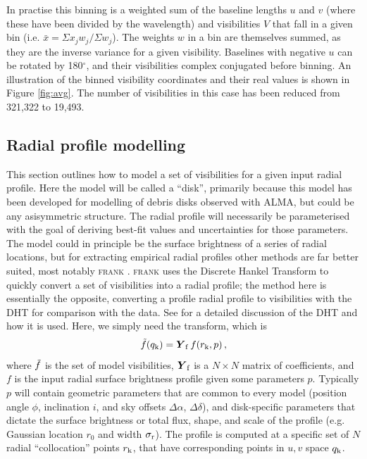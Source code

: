 \documentclass[fleqn,usenatbib]{mnras}
\begin{document}
In practise this binning is a weighted sum of the baseline lengths $u$ and $v$ (where these have been divided by the wavelength) and visibilities $V$ that fall in a given bin (i.e. $\bar{x} = \Sigma x_j w_j / \Sigma w_j$). The weights $w$ in a bin are themselves summed, as they are the inverse variance for a given visibility. Baselines with negative $u$ can be rotated by 180$^\circ$, and their visibilities complex conjugated before binning. An illustration of the binned visibility coordinates and their real values is shown in Figure \ref{fig:avg}. The number of visibilities in this case has been reduced from 321,322 to 19,493.

\subsection{Radial profile modelling}

This section outlines how to model a set of visibilities for a given input radial profile. Here the model will be called a ``disk'', primarily because this model has been developed for modelling of debris disks observed with ALMA, but could be any asisymmetric structure. The radial profile will necessarily be parameterised with the goal of deriving best-fit values and uncertainties for those parameters. The model could in principle be the surface brightness of a series of radial locations, but for extracting empirical radial profiles other methods are far better suited, most notably \textsc{frank} \citep{2020MNRAS.tmp.1491J}. \textsc{frank} uses the Discrete Hankel Transform to quickly convert a set of visibilities into a radial profile; the method here is essentially the opposite, converting a profile radial profile to visibilities with the DHT for comparison with the data. See \citet{2020MNRAS.tmp.1491J} for a detailed discussion of the DHT and how it is used. Here, we simply need the transform, which is
\begin{equation}\label{eq:dht}
    \Tilde{f}(q_{\rm k}) = \boldsymbol{Y}_{\rm f} \, f(r_{\rm k}, p) \, ,
\end{equation}
where $\Tilde{f}$ is the set of model visibilities, $\boldsymbol{Y}_{\rm f}$ is a $N \times N$ matrix of coefficients, and $f$ is the input radial surface brightness profile given some parameters $p$. Typically $p$ will contain geometric parameters that are common to every model (position angle $\phi$, inclination $i$, and sky offsets $\Delta \alpha$, $\Delta \delta$), and disk-specific parameters that dictate the surface brightness or total flux, shape, and scale of the profile (e.g. Gaussian location $r_0$ and width $\sigma_{\rm r}$). The profile is computed at a specific set of $N$ radial ``collocation'' points $r_{\rm k}$, that have corresponding points in $u,v$ space $q_{\rm k}$.
\end{document}
